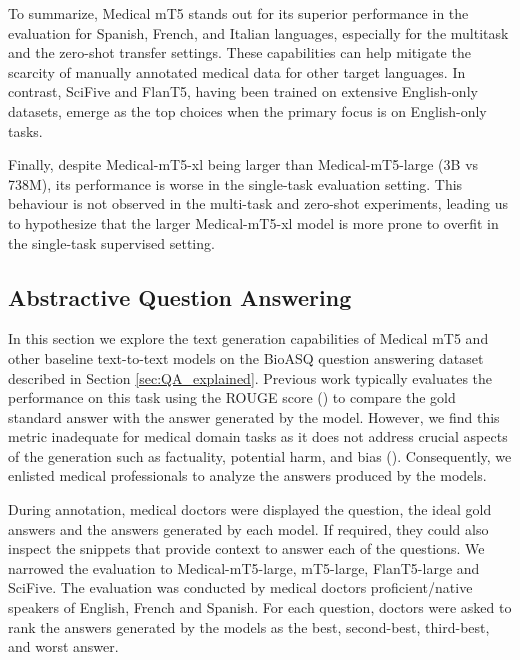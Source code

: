 To summarize, Medical mT5 stands out for its superior performance in the evaluation for Spanish, French, and Italian languages, especially for the multitask and the zero-shot transfer settings. These capabilities can help mitigate the scarcity of manually annotated medical data for other target languages. In contrast, SciFive and FlanT5, having been trained on extensive English-only datasets, emerge as the top choices when the primary focus is on English-only tasks.

Finally, despite Medical-mT5-xl being larger than Medical-mT5-large (3B vs 738M), its performance is worse in the single-task evaluation setting. This behaviour is not observed in the multi-task and zero-shot experiments, leading us to hypothesize that the larger Medical-mT5-xl model is more prone to overfit in the single-task supervised setting.



\subsection{Abstractive Question Answering}


In this section we explore the text generation capabilities of Medical mT5 and other baseline text-to-text models on the BioASQ question answering dataset described in Section
\ref{sec:QA_explained}. Previous work typically evaluates the performance 
on this task using the ROUGE score (\cite{bioasq}) to
compare the gold standard answer with the answer generated by the model.
However, we find this metric inadequate for medical domain tasks as it does not
address crucial aspects of the generation such as factuality, potential harm, and bias
(\cite{singhal-palm}). Consequently, we enlisted medical
professionals to analyze the answers produced by the models.



During annotation, medical doctors were displayed the question, the ideal gold answers and
the answers generated by each model. If required, they could also inspect
the snippets that provide context to answer each of the questions. We narrowed the
evaluation to Medical-mT5-large, mT5-large, FlanT5-large and SciFive. The evaluation
was conducted by medical doctors proficient/native speakers of English, French and Spanish. For each question, doctors were asked to rank the
answers generated by the models as the best, second-best, third-best, and worst
answer.

